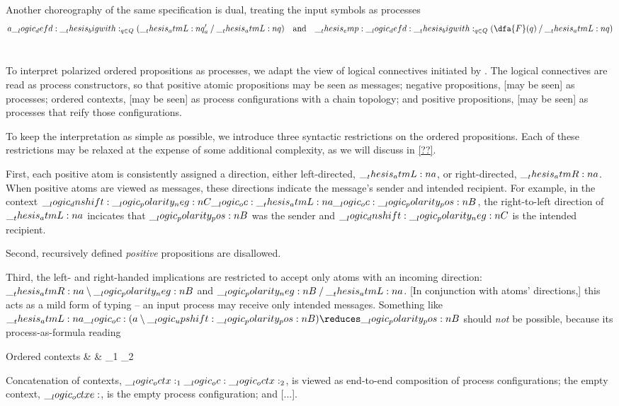 Another choreography of the same specification is dual, treating the input symbols as processes
\begin{equation*}
  a \defd \bigwith_{q \in Q}(\atmL{q}'_a \pmir \atmL{q})
  \quad\text{and}\quad
  \emp \defd \bigwith_{q \in Q}(\dfa{F}(q) \pmir \atmL{q})
\end{equation*}

\section{}

To interpret polarized ordered propositions as processes, we adapt the  view of logical connectives initiated by \textcite{??}.
The logical connectives are read as process constructors, so that positive atomic propositions may be seen as messages; negative propositions, [may be seen] as processes; ordered contexts, [may be seen] as process configurations with a chain topology; and positive propositions, [may be seen] as processes that reify those configurations.

To keep the interpretation as simple as possible, we introduce three syntactic restrictions on the ordered propositions.
Each of these restrictions may be relaxed at the expense of some additional complexity, as we will discuss in \cref{??}.

First, each positive atom is consistently assigned a direction, either left-directed, $\__thesis_atmL:n {a}$, or right-directed, $\__thesis_atmR:n {a}$.
When positive atoms are viewed as messages, these directions indicate the message's sender and intended recipient.
For example, in the context $\__logic_dnshift: \__logic_polarity_neg:n {C} \__logic_oc: \__thesis_atmL:n {a} \__logic_oc: \__logic_polarity_pos:n {B}$, the right-to-left direction of $\__thesis_atmL:n {a}$ incicates that $\__logic_polarity_pos:n {B}$ was the sender and $\__logic_dnshift: \__logic_polarity_neg:n {C}$ is the intended recipient.



Second, recursively defined \emph{positive} propositions are disallowed.

Third, the left- and right-handed implications are restricted to accept only atoms with an incoming direction: $\__thesis_atmR:n {a} \mathbin { \setminus } \__logic_polarity_neg:n {B}$ and $\__logic_polarity_neg:n {B} \mathbin { / } \__thesis_atmL:n {a}$.
[In conjunction with atoms' directions,] this acts as a mild form of typing -- an input process may receive only intended messages.
Something like $\atmL{a} \oc (a \limp \up \p{B}) \reduces \p{B}$ should \emph{not} be possible, because its process-as-formula reading


\begin{syntax*}
  Ordered contexts &
    \octx & \octx_1 \oc \octx_2 \mid \octxe \mid {}
\end{syntax*}
Concatenation of contexts, $\__logic_octx:_1 \__logic_oc: \__logic_octx:_2$, is viewed as end-to-end composition of process configurations;
the empty context, $\__logic_octxe:$, is the empty process configuration;
and [...].

